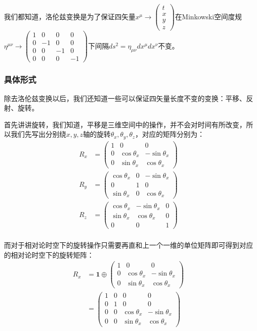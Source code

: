 \documentclass{article}
\begin{document}
我们都知道，洛伦兹变换是为了保证四矢量$x^\mu\to\begin{pmatrix}
    t\\x\\y\\z
\end{pmatrix}$在Minkowski空间度规$\eta^{\mu\nu}\to\begin{pmatrix}
    1&0&0&0\\
    0&-1&0&0\\
    0&0&-1&0\\
    0&0&0&-1
\end{pmatrix}$下间隔$ds^2=\eta_{\mu\nu}dx^\mu dx^\nu$不变。


\subsubsection{具体形式}

除去洛伦兹变换以后，我们还知道一些可以保证四矢量长度不变的变换：平移、反射、旋转。

首先讲讲旋转，我们知道，平移是三维空间中的操作，并不会对时间有所改变，所以我们先写出分别绕$x,y,z$轴的旋转$\theta_x,\theta_y,\theta_z$，对应的矩阵分别为：
\begin{align*}
    R_x&=
    \begin{pmatrix}
    1&0&0\\
    0&\cos\theta_x&-\sin\theta_x\\
    0&\sin\theta_x&\cos\theta_x    
    \end{pmatrix}\\
    R_y&=
    \begin{pmatrix}
    \cos\theta_x&0&-\sin\theta_x\\
    0&1&0\\
    \sin\theta_x&0&\cos\theta_x   
    \end{pmatrix}\\
    R_z&=
    \begin{pmatrix}
        \cos\theta_x&-\sin\theta_x&0\\
        \sin\theta_x&\cos\theta_x&0\\
        0&0&1   
        \end{pmatrix}\\
\end{align*}

而对于相对论时空下的旋转操作只需要再直和上一个一维的单位矩阵即可得到对应的相对论时空下的旋转矩阵：
\begin{align*}
    R_x&=\textbf{1}\oplus
    \begin{pmatrix}
        1&0&0\\
        0&\cos\theta_x&-\sin\theta_x\\
        0&\sin\theta_x&\cos\theta_x    
        \end{pmatrix}\\
    &=
    \begin{pmatrix}
        1&0&0&0\\
        0&1&0&0\\
        0&0&\cos\theta_x&-\sin\theta_x\\
        0&0&\sin\theta_x&\cos\theta_x
    \end{pmatrix}\\
\end{align*}
\end{document}
